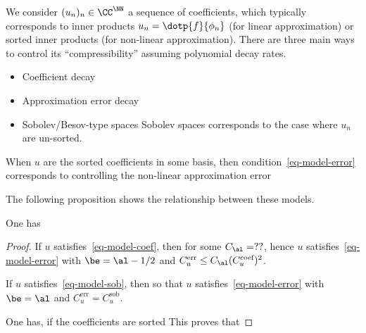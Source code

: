 We consider $(u_n)_n \in \CC^\NN$ a sequence of coefficients, which typically corresponds to inner products $u_n = \dotp{f}{\phi_n}$ (for linear approximation) or sorted inner products (for non-linear approximation). There are three main ways to control its ``compressibility'' assuming polynomial decay rates.

\begin{itemize}
	\item Coefficient decay	
	\item Approximation error decay	
	\item Sobolev/Besov-type spaces 
		Sobolev spaces corresponds to the case where $u_n$ are un-sorted.
\end{itemize}

When $u$ are the sorted coefficients in some basis,  then condition~\eqref{eq-model-error} corresponds to controlling the non-linear approximation error

The following proposition shows the relationship between these models.

\begin{prop}\label{prop-relation-compressibility}
	One has
\end{prop}

\begin{proof}
	If $u$ satisfies~\eqref{eq-model-coef}, then 
	for some $C_\al=??$, hence $u$ satisfies~\eqref{eq-model-error} with $\be=\al-1/2$ and $C_u^{\text{err}} \leq C_\al (C_u^{\text{coef}})^2$.
	
	If $u$ satisfies~\eqref{eq-model-sob}, then
	so that $u$ satisfies~\eqref{eq-model-error} with $\be=\al$ and $C_u^{\text{err}}=C_u^{\text{sob}}$.
	
	One has, if the coefficients are sorted
	This proves that

\end{proof}
\fi



